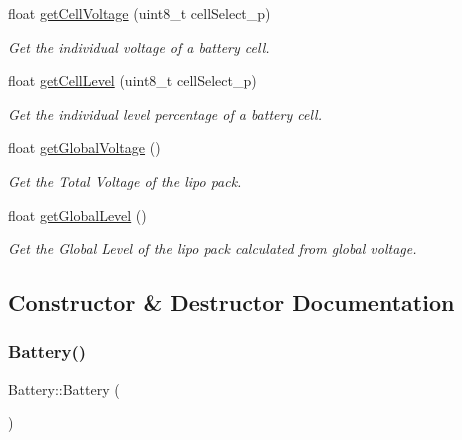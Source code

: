 \begin{DoxyCompactItemize}
float \hyperlink{class_battery_ae449209593f825ca7cefc958d51ba232}{get\+Cell\+Voltage} (uint8\+\_\+t cell\+Select\+\_\+p)
\begin{DoxyCompactList}\small\item\em Get the individual voltage of a battery cell. \end{DoxyCompactList}\item 
float \hyperlink{class_battery_a810c22577141039b044fdf59a9f9bdef}{get\+Cell\+Level} (uint8\+\_\+t cell\+Select\+\_\+p)
\begin{DoxyCompactList}\small\item\em Get the individual level percentage of a battery cell. \end{DoxyCompactList}\item 
float \hyperlink{class_battery_a288d5d3b5ebbe964751a9d64519aacdb}{get\+Global\+Voltage} ()
\begin{DoxyCompactList}\small\item\em Get the Total Voltage of the lipo pack. \end{DoxyCompactList}\item 
float \hyperlink{class_battery_a16e5bfb8a07ce93c08382fbcfb0b19be}{get\+Global\+Level} ()
\begin{DoxyCompactList}\small\item\em Get the Global Level of the lipo pack calculated from global voltage. \end{DoxyCompactList}\end{DoxyCompactItemize}


\subsection{Constructor \& Destructor Documentation}
\mbox{\label{class_battery_a36a6234c583e3b3506f4a77e3eb49989}} 
\subsubsection{\texorpdfstring{Battery()}{Battery()}}
{\footnotesize\ttfamily Battery\+::\+Battery (\begin{DoxyParamCaption}{ }\end{DoxyParamCaption})}

\mbox{\label{class_battery_a637d8766eb5cbdb33ab2a19a30622bc3}} 
